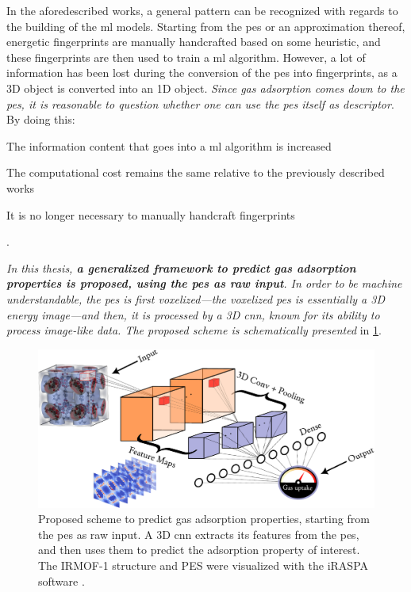 In the aforedescribed works, a general pattern can be recognized with regards to
the building of the \gls{ml} models. Starting from the \gls{pes} or an
approximation thereof, energetic fingerprints are manually handcrafted based on
some heuristic, and these fingerprints are then used to train a \gls{ml}
algorithm. However, a lot of information has been lost during the conversion of
the \gls{pes} into fingerprints, as a 3D object is converted into an 1D object.
\emph{Since gas adsorption comes down to the \gls{pes}, it is reasonable to
question whether one can use the \gls{pes} itself as descriptor}.  By doing
this:
\begin{enumerate*}[label=\roman*).]
	\item The information content that goes into a \gls{ml} algorithm is increased
	\item The computational cost remains the same relative
		to the previously described works
	\item It is no longer necessary to manually handcraft fingerprints
\end{enumerate*}.

\emph{In this thesis, \textbf{a generalized framework to predict gas adsorption
properties is proposed, using the \gls{pes} as raw input}. In order to be
machine understandable, the \gls{pes} is first voxelized---the voxelized
\gls{pes} is essentially a 3D energy image---and then, it is
processed by a 3D \gls{cnn}, known for its ability to process image-like data.
The proposed scheme is schematically presented} in \Figure{} \ref{fig:approach}.

\begin{figure}
	\centering
	\includegraphics[width=\textwidth]{fig/approach.pdf}
	\caption[Generalized framework to predict gas adsorption
	properties.]{Proposed scheme to predict gas adsorption properties, starting
	from the \gls{pes} as raw input. A 3D \gls{cnn} extracts its
	features from the \gls{pes}, and then uses them to predict
	the adsorption property of interest. The IRMOF-1 structure and PES were
	visualized with the iRASPA software \parencite{Dubbeldam2018}.}
	\label{fig:approach}
\end{figure}
